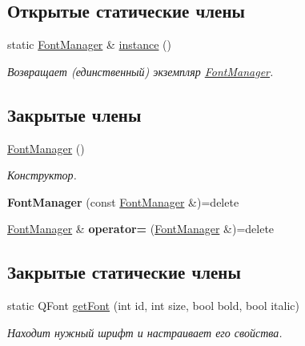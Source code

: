 \subsection*{Открытые статические члены}
\begin{DoxyCompactItemize}
\item 
static \hyperlink{class_font_manager}{Font\+Manager} \& \hyperlink{class_font_manager_a53cd643c23b4c4bc18a0461e18f2291f}{instance} ()\hypertarget{class_font_manager_a53cd643c23b4c4bc18a0461e18f2291f}{}\label{class_font_manager_a53cd643c23b4c4bc18a0461e18f2291f}

\begin{DoxyCompactList}\small\item\em Возвращает (единственный) экземпляр \hyperlink{class_font_manager}{Font\+Manager}. \end{DoxyCompactList}\end{DoxyCompactItemize}
\subsection*{Закрытые члены}
\begin{DoxyCompactItemize}
\item 
\hyperlink{class_font_manager_a2f89acd28b5bd24e747aacd3208131ef}{Font\+Manager} ()
\begin{DoxyCompactList}\small\item\em Конструктор. \end{DoxyCompactList}\item 
{\bfseries Font\+Manager} (const \hyperlink{class_font_manager}{Font\+Manager} \&)=delete\hypertarget{class_font_manager_ad2df69d8089d4e217de41c05c27a40aa}{}\label{class_font_manager_ad2df69d8089d4e217de41c05c27a40aa}

\item 
\hyperlink{class_font_manager}{Font\+Manager} \& {\bfseries operator=} (\hyperlink{class_font_manager}{Font\+Manager} \&)=delete\hypertarget{class_font_manager_a9ce394118d9c617e9566d8ebfd0c585b}{}\label{class_font_manager_a9ce394118d9c617e9566d8ebfd0c585b}

\end{DoxyCompactItemize}
\subsection*{Закрытые статические члены}
\begin{DoxyCompactItemize}
\item 
static Q\+Font \hyperlink{class_font_manager_a4b31083bd250791a4a8de80b028b825d}{get\+Font} (int id, int size, bool bold, bool italic)
\begin{DoxyCompactList}\small\item\em Находит нужный шрифт и настраивает его свойства. \end{DoxyCompactList}\end{DoxyCompactItemize}

